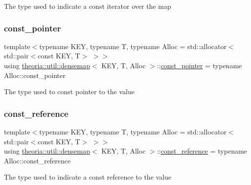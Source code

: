 The type used to indicate a const iterator over the map \mbox{\label{classtheoria_1_1util_1_1densemap_ab19ebc07bf788b5689adaa3a80b46c31}} 
\subsubsection{\texorpdfstring{const\+\_\+pointer}{const\_pointer}}
{\footnotesize\ttfamily template$<$typename K\+EY, typename T, typename Alloc = std\+::allocator$<$std\+::pair$<$const K\+E\+Y, T$>$ $>$$>$ \\
using \hyperlink{classtheoria_1_1util_1_1densemap}{theoria\+::util\+::densemap}$<$ K\+EY, T, Alloc $>$\+::\hyperlink{classtheoria_1_1util_1_1densemap_ab19ebc07bf788b5689adaa3a80b46c31}{const\+\_\+pointer} =  typename Alloc\+::const\+\_\+pointer}

The type used to const pointer to the value \mbox{\label{classtheoria_1_1util_1_1densemap_a7a3dd11d6fd160c467c43d2029c3592a}} 
\subsubsection{\texorpdfstring{const\+\_\+reference}{const\_reference}}
{\footnotesize\ttfamily template$<$typename K\+EY, typename T, typename Alloc = std\+::allocator$<$std\+::pair$<$const K\+E\+Y, T$>$ $>$$>$ \\
using \hyperlink{classtheoria_1_1util_1_1densemap}{theoria\+::util\+::densemap}$<$ K\+EY, T, Alloc $>$\+::\hyperlink{classtheoria_1_1util_1_1densemap_a7a3dd11d6fd160c467c43d2029c3592a}{const\+\_\+reference} =  typename Alloc\+::const\+\_\+reference}

The type used to indicate a const reference to the value \mbox{\label{classtheoria_1_1util_1_1densemap_a4ee170442110252d3033534246f9677f}} 
